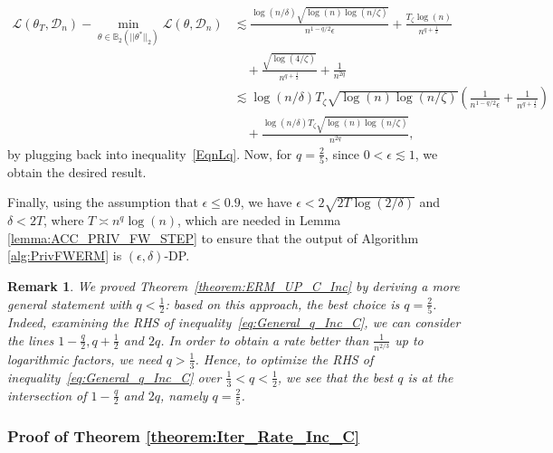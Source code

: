 \documentclass{article}
\newtheorem{remark}{\textbf{Remark}}
\begin{document}
\begin{align*}
\mathcal{L}(\theta_T, \mathcal{D}_n) - \mathop{\min}\limits_{\theta \in \mathbb{B}_2(||\theta^*||_2)}\mathcal{L}(\theta, \mathcal{D}_n) &\lesssim \frac{\log(n/\delta)\sqrt{\log(n)\log(n/\zeta)}}{n^{1 - q/2}\epsilon} + \frac{T_\zeta\log(n)}{n^{q + \frac{1}{2}}}\\
& \quad + \frac{\sqrt{\log(4/\zeta)}}{n^{q + \frac{1}{2}}} + \frac{1}{n^{2q}}\\
&\lesssim \log(n/\delta)T_\zeta\sqrt{\log(n)\log(n/\zeta)}\left(\frac{1}{{n^{1 - q/2}\epsilon}} + \frac{1}{n^{q + \frac{1}{2}}}\right)\\
& \quad + \frac{\log(n/\delta)T_\zeta\sqrt{\log(n)\log(n/\zeta)}}{n^{2q}},
\end{align*}
by plugging back into inequality~\eqref{EqnLq}. Now, for $q = \frac{2}{5}$, since $0 < \epsilon \lesssim 1$, we obtain the desired result.

Finally, using the assumption that $\epsilon \leq 0.9$, we have $\epsilon < 2\sqrt{2T\log(2/\delta)}$ and $\delta < 2T$, where $T \asymp n^q\log(n)$, which are needed in Lemma \ref{lemma:ACC_PRIV_FW_STEP} to ensure that the output of Algorithm \ref{alg:PrivFWERM} is $(\epsilon, \delta)$-DP.

\begin{remark}
We proved Theorem~\ref{theorem:ERM_UP_C_Inc} by deriving a more general statement with $q < \frac{1}{2}$: based on this approach, the best choice is $q = \frac{2}{5}$. Indeed, examining the RHS of inequality~\eqref{eq:General_q_Inc_C}, we can consider the lines $1 - \frac{q}{2}, q + \frac{1}{2}$ and $2q$. In order to obtain a rate better than $\frac{1}{n^{2/3}}$ up to logarithmic factors, we need $q > \frac{1}{3}$. Hence, to optimize the RHS of inequality~\eqref{eq:General_q_Inc_C} over $\frac{1}{3} < q < \frac{1}{2}$, we see that the best $q$ is at the intersection of $1 - \frac{q}{2}$ and $2q$, namely $q = \frac{2}{5}$.
\end{remark}

\subsubsection{Proof of Theorem \ref{theorem:Iter_Rate_Inc_C}}
\label{AppThmIterRate}
\end{document}
